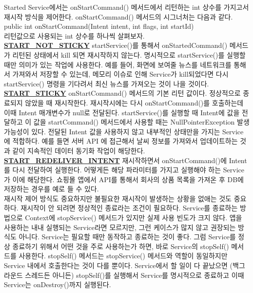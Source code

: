Started Service에서는 onStartCommand() 메서드에서 리턴하는 int 상수를 가지고서 재시작 방식을 제어한다. onStartCommand() 메서드의 시그너처는 다음과 같다.\\

public int onStartCommand(Intent intent, int flags, int startId)\\

리턴값으로 사용되는 int 상수를 하나씩 살펴보자.\\
\underline{\bfseries START\_NOT\_STICKY} startService()를 통해서 onStartedCommand() 메서드가 리턴된 상태에서 kill 되면 재시작하지 않는다. 명시적으로 startService()를 실행할 때만 의미가 있는 작업에 사용한다.
예를 들어, 화면에 보여줄 뉴스를 네트워크를 통해서 가져와서 저장할 수 있는데, 메모리 이슈로 인해 Service가 kill되었다면 다시 startService() 명령을 기다려서 최신 뉴스를 가져오는 것이 나을 것이다.\\

\underline{\bfseries START\_STICKY} onStartCommand() 메서드의 기본 리턴 값이다. 정상적으로 종료되지 않았을 때 재시작한다. 재시작시에는 다시 onStartCommand()를 호출하는데 이때 Intent 매개변수가 null로 전달된다.
startService()를 실행할 때 Intent에 값을 전달하고 이 값을 startCommand() 메서드에서 사용할 때는 NullPointerException 발생 가능성이 있다. 
전달된 Intent 값을 사용하지 않고 내부적인 상태만을 가지는 Service에 적합하다.
예를 들면 서버 API 에 접근해서 날씨 정보를 가져와서 업데이트하는 것과 같이 지속적인 데이터 동기화 작업이 해당한다.\\

\underline{\bfseries START\_REDELIVER\_INTENT} 재시작하면서 onStartCommand()에 Intent를 다시 전달하여 실행한다. 어떻게든 해당 파라미터를 가지고 실행해야 하는 Service가 이에 해당한다. 쇼핑몰 앱에서 API를 통해서 회사의 상품 목록을 가져온 후 DB에 저장하는 경우를 예로 들 수 있다.\\

재시작 제어 방식도 중요하지만 불필요한 재시작이 발생하는 상황을 없애는 것도 중요하다. 재시작이 안 되려면 정상적인 종료라는 조건이 필요하다. 
Service를 종료하는 방법으로 Context에 stopService() 메서드가 있지만 실제 사용 빈도가 크지 않다. 
앱을 사용하는 내내 실행되는 Service라면 모르지만, 그런 케이스가 많지 않고 권장되는 방식도 아니다. 
Service는 필요할 때만 동작하고 종료하는 것이 좋다.
그럼 Service를 정상 종료하기 위해서 어떤 것을 주로 사용하는가 하면, 바로 Service의 stopSelf() 메서드를 사용한다. 
stopSelf() 메서드는 stopService() 메서드와 역할이 동일하지만 Service 내에서 호출한다는 것이 다를 뿐이다. Service에서 할 일이 다 끝났으면 (백그라운드 스레드든 아니든) stopSelf()를 실행해서 Service를 명시적으로 종료하고 이때 Service는 onDestroy()까지 실행된다.\\

